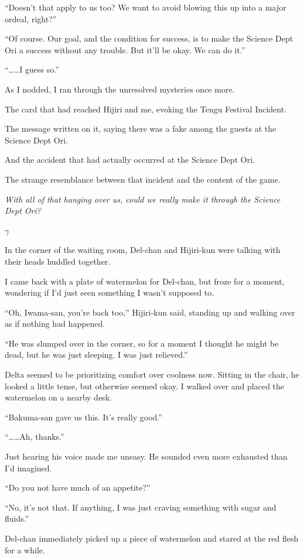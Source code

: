 \documentclass[
    a4paper,
    12pt,
    twoside,
    openany,
    UTF8,
    fontset=windows
]{ctexbook}
\begin{document}
``Doesn't that apply to us too? We want to avoid blowing this up into a major ordeal, right?''

``Of course. Our goal, and the condition for success, is to make the Science Dept Ori a success without any trouble. But it'll be okay. We can do it.''

``\dots\dots I guess so.''

As I nodded, I ran through the unresolved mysteries once more.

The card that had reached Hijiri and me, evoking the Tengu Festival Incident.

The message written on it, saying there was a fake among the guests at the Science Dept Ori.

And the accident that had actually occurred at the Science Dept Ori.

The strange resemblance between that incident and the content of the game.

\textit{With all of that hanging over us, could we really make it through the Science Dept Ori?}

$\gamma$

In the corner of the waiting room, Del-chan and Hijiri-kun were talking with their heads huddled together.

I came back with a plate of watermelon for Del-chan, but froze for a moment, wondering if I'd just seen something I wasn't supposed to.

``Oh, Iwama-san, you're back too,'' Hijiri-kun said, standing up and walking over as if nothing had happened.

``He was slumped over in the corner, so for a moment I thought he might be dead, but he was just sleeping. I was just relieved.''

Delta seemed to be prioritizing comfort over coolness now. Sitting in the chair, he looked a little tense, but otherwise seemed okay. I walked over and placed the watermelon on a nearby desk.

``Bakuma-san gave us this. It's really good.''

``\dots\dots Ah, thanks.''

Just hearing his voice made me uneasy. He sounded even more exhausted than I'd imagined.

``Do you not have much of an appetite?''

``No, it's not that. If anything, I was just craving something with sugar and fluids.''

Del-chan immediately picked up a piece of watermelon and stared at the red flesh for a while.
\end{document}
